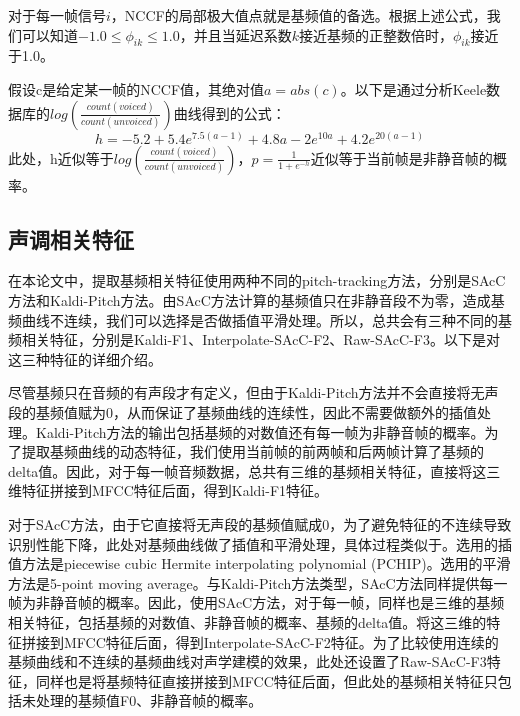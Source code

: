 对于每一帧信号$i$，NCCF的局部极大值点就是基频值的备选。根据上述公式，我们可以知道$-1.0\leqslant\phi_{ik}\leqslant1.0$，并且当延迟系数$k$接近基频的正整数倍时，$\phi_{ik}$接近于1.0。

假设c是给定某一帧的NCCF值，其绝对值$a=abs(c)$。以下是通过分析Keele数据库的$log(\frac{count(voiced)}{count(unvoiced)})$曲线得到的公式：
\begin{equation}h=-5.2+5.4 e^{7.5 (a-1)}+4.8 a-2 e^{10 a}+4.2 e^{20 (a-1)}\end{equation}
此处，h近似等于$log(\frac{count(voiced)}{count(unvoiced)})$，$p=\frac{1}{1+e^{-h}}$近似等于当前帧是非静音帧的概率。
\subsection{声调相关特征}
在本论文中，提取基频相关特征使用两种不同的pitch-tracking方法，分别是SAcC方法和Kaldi-Pitch方法。由SAcC方法计算的基频值只在非静音段不为零，造成基频曲线不连续，我们可以选择是否做插值平滑处理。所以，总共会有三种不同的基频相关特征，分别是Kaldi-F1、Interpolate-SAcC-F2、Raw-SAcC-F3。以下是对这三种特征的详细介绍。

尽管基频只在音频的有声段才有定义，但由于Kaldi-Pitch方法并不会直接将无声段的基频值赋为0，从而保证了基频曲线的连续性，因此不需要做额外的插值处理。Kaldi-Pitch方法的输出包括基频的对数值还有每一帧为非静音帧的概率。为了提取基频曲线的动态特征，我们使用当前帧的前两帧和后两帧计算了基频的delta值。因此，对于每一帧音频数据，总共有三维的基频相关特征，直接将这三维特征拼接到MFCC特征后面，得到Kaldi-F1特征。

对于SAcC方法，由于它直接将无声段的基频值赋成0，为了避免特征的不连续导致识别性能下降，此处对基频曲线做了插值和平滑处理，具体过程类似于\cite{lei2006improved}。选用的插值方法是piecewise cubic Hermite interpolating polynomial (PCHIP)\cite{fritsch1980monotone}。选用的平滑方法是5-point moving average。与Kaldi-Pitch方法类型，SAcC方法同样提供每一帧为非静音帧的概率。因此，使用SAcC方法，对于每一帧，同样也是三维的基频相关特征，包括基频的对数值、非静音帧的概率、基频的delta值。将这三维的特征拼接到MFCC特征后面，得到Interpolate-SAcC-F2特征。为了比较使用连续的基频曲线和不连续的基频曲线对声学建模的效果，此处还设置了Raw-SAcC-F3特征，同样也是将基频特征直接拼接到MFCC特征后面，但此处的基频相关特征只包括未处理的基频值F0、非静音帧的概率。
